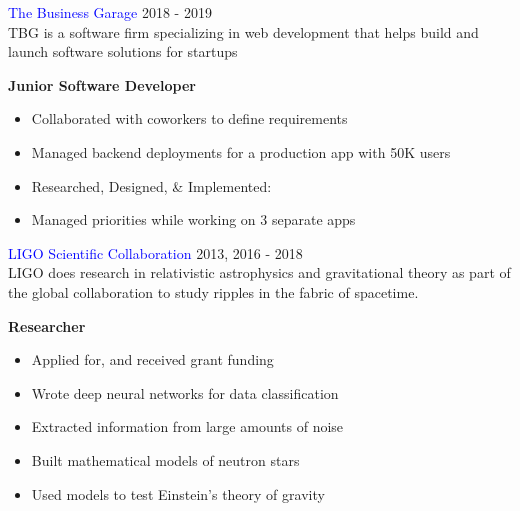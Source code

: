 \documentclass[12pt]{resume}
\begin{document}
\begin{minipage}[t]{0.48\textwidth}
        \textcolor{blue}{The Business Garage} {\hfill 2018 - 2019} \\
        TBG is a software firm specializing in web development
        that helps build and launch software solutions for startups
        \begin{spacing}{1.2}
            {\bf Junior Software Developer}
        \end{spacing}
        \vspace{-1mm}
        \begin{itemize}
            \setlength\itemsep{.2em}
            \item {Collaborated with coworkers to define requirements}
            \item {Managed backend deployments for a production app with 50K users}
            \item {Researched, Designed, \& Implemented:}
            \item {Managed priorities while working on 3 separate apps}
        \end{itemize}

        \vspace{1em}

        \textcolor{blue}{LIGO Scientific Collaboration} {\hfill 2013, 2016 - 2018} \\
        LIGO does research in relativistic astrophysics and gravitational
        theory as part of the global collaboration to study ripples in the
        fabric of spacetime.
        \begin{spacing}{1.2}
            {\bf Researcher}
        \end{spacing}
        \vspace{-1mm}
        \begin{itemize}
            \setlength\itemsep{.2em}
            \item {Applied for, and received grant funding}
            \item {Wrote deep neural networks for data classification}
            \item {Extracted information from large amounts of noise}
            \item {Built mathematical models of neutron stars}
            \item {Used models to test Einstein’s theory of gravity}
        \end{itemize}

    \end{minipage}
\end{document}
